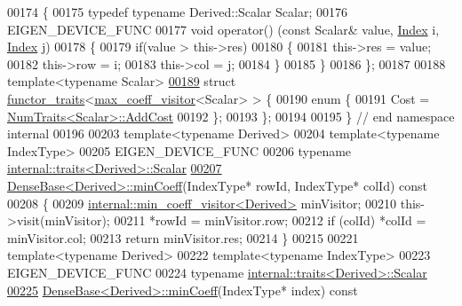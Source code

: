 \begin{DoxyCode}
00174 \{
00175   \textcolor{keyword}{typedef} \textcolor{keyword}{typename} Derived::Scalar Scalar; 
00176   EIGEN\_DEVICE\_FUNC
00177   \textcolor{keywordtype}{void} operator() (\textcolor{keyword}{const} Scalar& value, \hyperlink{namespace_eigen_a62e77e0933482dafde8fe197d9a2cfde}{Index} i, \hyperlink{namespace_eigen_a62e77e0933482dafde8fe197d9a2cfde}{Index} j)
00178   \{
00179     \textcolor{keywordflow}{if}(value > this->res)
00180     \{
00181       this->res = value;
00182       this->row = i;
00183       this->col = j;
00184     \}
00185   \}
00186 \};
00187 
00188 \textcolor{keyword}{template}<\textcolor{keyword}{typename} Scalar>
\hyperlink{struct_eigen_1_1internal_1_1functor__traits_3_01max__coeff__visitor_3_01_scalar_01_4_01_4}{00189} \textcolor{keyword}{struct }\hyperlink{struct_eigen_1_1internal_1_1functor__traits}{functor\_traits}<\hyperlink{struct_eigen_1_1internal_1_1max__coeff__visitor}{max\_coeff\_visitor}<Scalar> > \{
00190   \textcolor{keyword}{enum} \{
00191     Cost = \hyperlink{group___core___module_struct_eigen_1_1_num_traits}{NumTraits<Scalar>::AddCost}
00192   \};
00193 \};
00194 
00195 \} \textcolor{comment}{// end namespace internal}
00196 
00203 \textcolor{keyword}{template}<\textcolor{keyword}{typename} Derived>
00204 \textcolor{keyword}{template}<\textcolor{keyword}{typename} IndexType>
00205 EIGEN\_DEVICE\_FUNC
00206 \textcolor{keyword}{typename} \hyperlink{struct_eigen_1_1internal_1_1traits}{internal::traits<Derived>::Scalar}
\hyperlink{group___core___module_a05044a037125e705d87bd28f678b914c}{00207} \hyperlink{group___core___module_a6634944be3d4fef551b57ffad30467f2}{DenseBase<Derived>::minCoeff}(IndexType* rowId, IndexType* colId)\textcolor{keyword}{ const}
00208 \textcolor{keyword}{}\{
00209   \hyperlink{struct_eigen_1_1internal_1_1min__coeff__visitor}{internal::min\_coeff\_visitor<Derived>} minVisitor;
00210   this->visit(minVisitor);
00211   *rowId = minVisitor.row;
00212   \textcolor{keywordflow}{if} (colId) *colId = minVisitor.col;
00213   \textcolor{keywordflow}{return} minVisitor.res;
00214 \}
00215 
00221 \textcolor{keyword}{template}<\textcolor{keyword}{typename} Derived>
00222 \textcolor{keyword}{template}<\textcolor{keyword}{typename} IndexType>
00223 EIGEN\_DEVICE\_FUNC
00224 \textcolor{keyword}{typename} \hyperlink{struct_eigen_1_1internal_1_1traits}{internal::traits<Derived>::Scalar}
\hyperlink{group___core___module_a7d6ebd550eaaee24fed7880c39ae3f35}{00225} \hyperlink{group___core___module_a6634944be3d4fef551b57ffad30467f2}{DenseBase<Derived>::minCoeff}(IndexType* index)\textcolor{keyword}{ const}

\end{DoxyCode}
